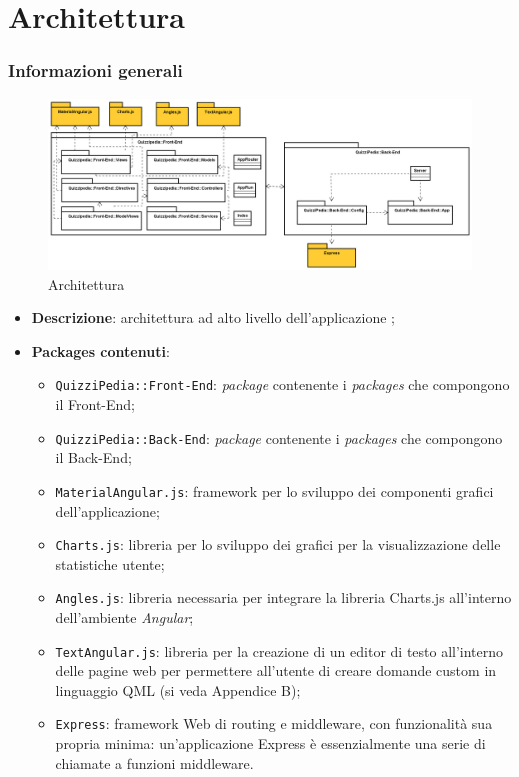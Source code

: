 \newpage

\section{Architettura}

\subsubsection{Informazioni generali}
\label{Architettura}
\begin{figure}[ht]
	\centering
	\includegraphics[scale=0.35]{UML/Package/QuizziPedia.png}
	\caption{Architettura}
\end{figure}
\FloatBarrier
\begin{itemize}
	\item \textbf{Descrizione}: architettura ad alto livello dell'applicazione \progetto;
	\item \textbf{Packages contenuti}:
	\begin{itemize}
		\item \texttt{QuizziPedia::Front-End}: \textit{package} contenente i \textit{packages} che compongono il Front-End;
		\item \texttt{QuizziPedia::Back-End}: \textit{package} contenente i \textit{packages} che compongono il Back-End;
		\item \texttt{MaterialAngular.js}: framework per lo sviluppo dei componenti grafici dell'applicazione;
		\item \texttt{Charts.js}: libreria per lo sviluppo dei grafici per la visualizzazione delle statistiche utente;
		\item \texttt{Angles.js}: libreria necessaria per integrare la libreria Charts.js all'interno dell'ambiente \textit{Angular};
		\item \texttt{TextAngular.js}: libreria per la creazione di un editor di testo all'interno delle pagine web per permettere all'utente di creare domande custom in linguaggio QML (si veda Appendice B);
		\item \texttt{Express}: framework Web di routing e middleware, con funzionalità sua propria minima: un’applicazione Express è essenzialmente una serie di chiamate a funzioni middleware.
	\end{itemize}
\end{itemize}
